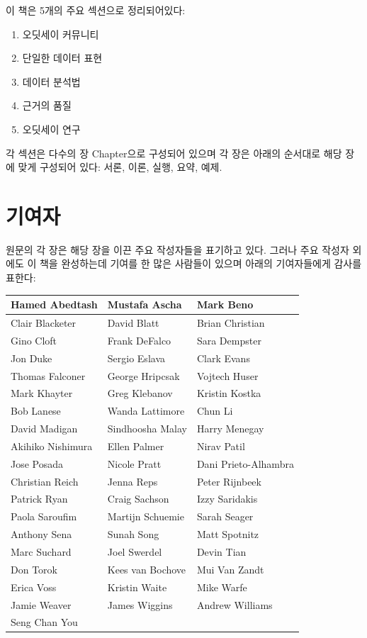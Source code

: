 \documentclass[10.5pt]{book}
\providecommand{\tightlist}{%
  \setlength{\itemsep}{0pt}\setlength{\parskip}{0pt}}
\theoremstyle{definition}
\theoremstyle{definition}
\theoremstyle{definition}
\theoremstyle{remark}
\begin{document}
이 책은 5개의 주요 섹션으로 정리되어있다:

\begin{enumerate}
\def\labelenumi{\Roman{enumi})}
\tightlist
\item
  오딧세이 커뮤니티
\item
  단일한 데이터 표현
\item
  데이터 분석법
\item
  근거의 품질
\item
  오딧세이 연구
\end{enumerate}

각 섹션은 다수의 장 Chapter으로 구성되어 있으며 각 장은 아래의 순서대로
해당 장에 맞게 구성되어 있다: 서론, 이론, 실행, 요약, 예제.

\section*{기여자}

원문의 각 장은 해당 장을 이끈 주요 작성자들을 표기하고 있다. 그러나 주요
작성자 외에도 이 책을 완성하는데 기여를 한 많은 사람들이 있으며 아래의
기여자들에게 감사를 표한다:

\begin{tabular}{l|l|l}
\hline
Hamed Abedtash & Mustafa Ascha & Mark Beno\\
\hline
Clair Blacketer & David Blatt & Brian Christian\\
\hline
Gino Cloft & Frank DeFalco & Sara Dempster\\
\hline
Jon Duke & Sergio Eslava & Clark Evans\\
\hline
Thomas Falconer & George Hripcsak & Vojtech Huser\\
\hline
Mark Khayter & Greg Klebanov & Kristin Kostka\\
\hline
Bob Lanese & Wanda Lattimore & Chun Li\\
\hline
David Madigan & Sindhoosha Malay & Harry Menegay\\
\hline
Akihiko Nishimura & Ellen Palmer & Nirav Patil\\
\hline
Jose Posada & Nicole Pratt & Dani Prieto-Alhambra\\
\hline
Christian Reich & Jenna Reps & Peter Rijnbeek\\
\hline
Patrick Ryan & Craig Sachson & Izzy Saridakis\\
\hline
Paola Saroufim & Martijn Schuemie & Sarah Seager\\
\hline
Anthony Sena & Sunah Song & Matt Spotnitz\\
\hline
Marc Suchard & Joel Swerdel & Devin Tian\\
\hline
Don Torok & Kees van Bochove & Mui Van Zandt\\
\hline
Erica Voss & Kristin Waite & Mike Warfe\\
\hline
Jamie Weaver & James Wiggins & Andrew Williams\\
\hline
Seng Chan You &  & \\
\hline
\end{tabular}
\end{document}
